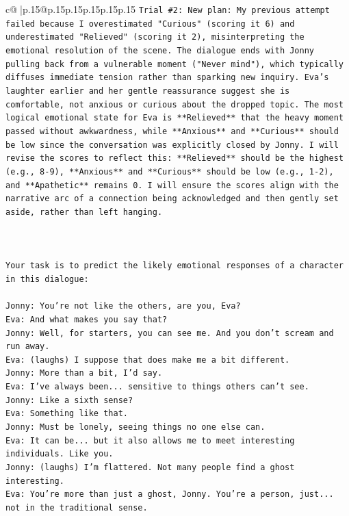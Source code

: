 \documentclass{article}
\begin{document}
{\begin{supertabular}{c@{$\;$}|p{.15\linewidth}@{}p{.15\linewidth}p{.15\linewidth}p{.15\linewidth}p{.15\linewidth}p{.15\linewidth}}
{{{\texttt{Trial \#2: New plan: My previous attempt failed because I overestimated "Curious" (scoring it 6) and underestimated "Relieved" (scoring it 2), misinterpreting the emotional resolution of the scene. The dialogue ends with Jonny pulling back from a vulnerable moment ("Never mind"), which typically diffuses immediate tension rather than sparking new inquiry. Eva's laughter earlier and her gentle reassurance suggest she is comfortable, not anxious or curious about the dropped topic. The most logical emotional state for Eva is **Relieved** that the heavy moment passed without awkwardness, while **Anxious** and **Curious** should be low since the conversation was explicitly closed by Jonny. I will revise the scores to reflect this: **Relieved** should be the highest (e.g., 8{-}9), **Anxious** and **Curious** should be low (e.g., 1{-}2), and **Apathetic** remains 0. I will ensure the scores align with the narrative arc of a connection being acknowledged and then gently set aside, rather than left hanging.} \\
\\ 
\\ 
\\ 
\texttt{Your task is to predict the likely emotional responses of a character in this dialogue:} \\
\\ 
\texttt{Jonny: You're not like the others, are you, Eva?} \\
\texttt{Eva: And what makes you say that?} \\
\texttt{Jonny: Well, for starters, you can see me. And you don't scream and run away.} \\
\texttt{Eva: (laughs) I suppose that does make me a bit different.} \\
\texttt{Jonny: More than a bit, I'd say. } \\
\texttt{Eva: I've always been... sensitive to things others can't see. } \\
\texttt{Jonny: Like a sixth sense?} \\
\texttt{Eva: Something like that. } \\
\texttt{Jonny: Must be lonely, seeing things no one else can.} \\
\texttt{Eva: It can be... but it also allows me to meet interesting individuals. Like you.} \\
\texttt{Jonny: (laughs) I'm flattered. Not many people find a ghost interesting.} \\
\texttt{Eva: You're more than just a ghost, Jonny. You're a person, just... not in the traditional sense.} \\
}}}
\end{supertabular}}
\end{document}
